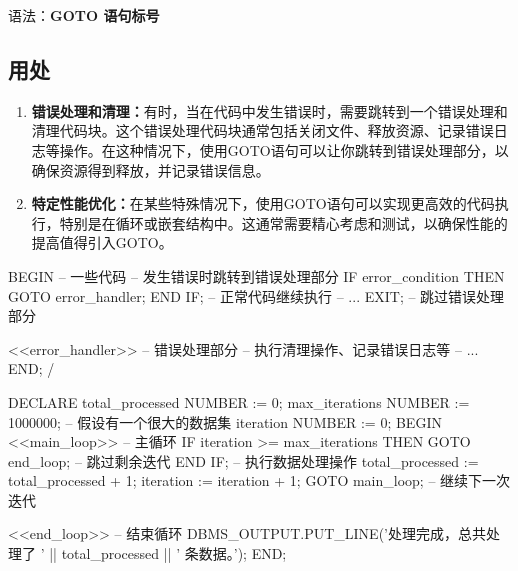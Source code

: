 \documentclass[11pt, a4paper, oneside, UTF8]{ctexbook}
\let\kaishu\relax %
\begin{document}
语法：{\bfseries\kaishu GOTO 语句标号}

\subsection{用处}
\begin{enumerate}
  \item {\bfseries\kaishu 错误处理和清理：}有时，当在代码中发生错误时，需要跳转到一个错误处理和清理代码块。这个错误处理代码块通常包括关闭文件、释放资源、记录错误日志等操作。在这种情况下，使用GOTO语句可以让你跳转到错误处理部分，以确保资源得到释放，并记录错误信息。
  \item {\bfseries\kaishu 特定性能优化：}在某些特殊情况下，使用GOTO语句可以实现更高效的代码执行，特别是在循环或嵌套结构中。这通常需要精心考虑和测试，以确保性能的提高值得引入GOTO。
\end{enumerate}
\begin{plsql}[caption=错误处理示例代码]
BEGIN
  -- 一些代码
  -- 发生错误时跳转到错误处理部分
  IF error_condition THEN
    GOTO error_handler;
  END IF;
  -- 正常代码继续执行
  -- ...
  EXIT; -- 跳过错误处理部分
  
  <<error_handler>> -- 错误处理部分
  -- 执行清理操作、记录错误日志等
  -- ...
END;
/
\end{plsql}

\begin{plsql}[caption=性能提升示例代码（循环）]
DECLARE
  total_processed NUMBER := 0;
  max_iterations NUMBER := 1000000; -- 假设有一个很大的数据集
  iteration NUMBER := 0;
BEGIN
  <<main_loop>> -- 主循环
  IF iteration >= max_iterations THEN
    GOTO end_loop; -- 跳过剩余迭代
  END IF;
  -- 执行数据处理操作
  total_processed := total_processed + 1;
  iteration := iteration + 1;
  GOTO main_loop; -- 继续下一次迭代

  <<end_loop>> -- 结束循环
  DBMS_OUTPUT.PUT_LINE('处理完成，总共处理了 ' || total_processed || ' 条数据。');
END;
\end{plsql}


\end{document}
